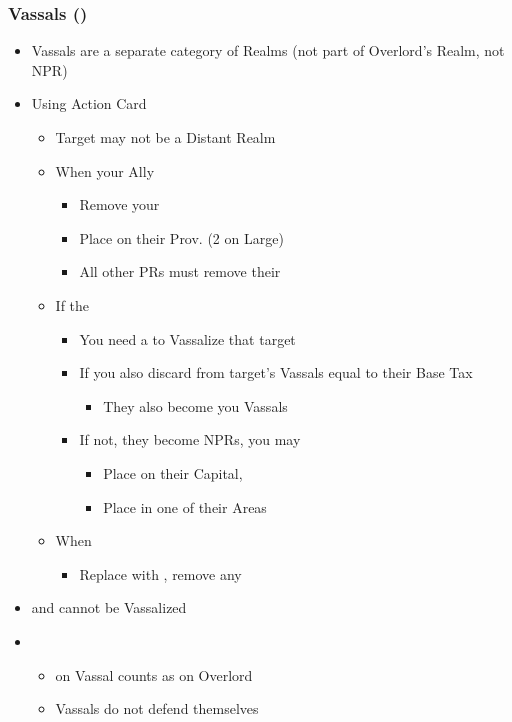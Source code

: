 \documentclass[10pt]{article}
\begin{document}
\subsubsection*{Vassals (\vassal) }
\begin{itemize}
	\item Vassals are a separate category of Realms (not part of Overlord's Realm, not NPR)
	\item Using  Action Card
	\begin{itemize}
		\item Target may not be a Distant Realm
		\item When  your Ally
		\begin{itemize}
			\item Remove your \alliance
			\item Place \vassals on their Prov. (2 on Large)
			\item All other PRs must remove their \marriages
		\end{itemize}
		\item If the 
		\begin{itemize}
			\item You need a \marriage to Vassalize that target
			\item If you also discard \influence from target's Vassals equal to their Base Tax
			\begin{itemize}
				\item They also become you Vassals
			\end{itemize}
			\item If not, they become NPRs, you may
			\begin{itemize}
				\item Place \alliance on their Capital, 
				\item Place \claim in one of their Areas
			\end{itemize}
		\end{itemize}
		\item When 
		\begin{itemize}
			\item Replace \vassals with \towns, remove any \marriage
		\end{itemize}
	\end{itemize}
	\item {} and  cannot be Vassalized
	\item {}
	\begin{itemize}
		\item \claim on Vassal counts as \claim on Overlord
		\item Vassals do not defend themselves
	\end{itemize}
\end{itemize}
\end{document}

